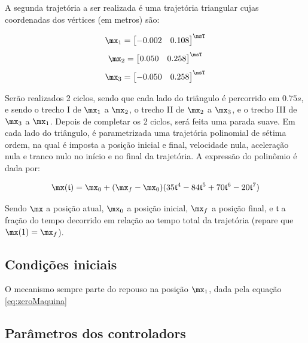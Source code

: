 \documentclass[]{politex}
\begin{document}
A segunda trajetória a ser realizada é uma trajetória triangular cujas coordenadas dos vértices (em metros) são:

\begin{equation} \label{eq:zeroMaquina}
\mx_1 = \begin{bmatrix}
-0.002 & 0.108 
\end{bmatrix}^\msT
\end{equation}
\begin{equation}
\mx_2 = \begin{bmatrix}
0.050 & 0.258 
\end{bmatrix}^\msT
\end{equation}
\begin{equation}
\mx_3 = \begin{bmatrix}
-0.050 & 0.258 
\end{bmatrix}^\msT
\end{equation}

Serão realizados 2 ciclos, sendo que cada lado do triângulo é percorrido em $0.75s$, e sendo o trecho I de $\mx_1$ a $\mx_2$, o trecho II de $\mx_2$ a $\mx_3$, e o trecho III de $\mx_3$ a $\mx_1$. Depois de completar os 2 ciclos, será feita uma parada suave. Em cada lado do triângulo, é parametrizada uma trajetória polinomial de sétima ordem, na qual é imposta a posição inicial e final, velocidade nula, aceleração nula e tranco nulo no início e no final da trajetória. A expressão do polinômio é dada por:

\begin{equation}
\mx(\mathfrak{t}) = \mx_0 + (\mx_f - \mx_0) (35 \mathfrak{t}^4 - 84 \mathfrak{t}^5 + 70 \mathfrak{t}^6 - 20 \mathfrak{t}^7)
\end{equation}

Sendo $\mx$ a posição atual, $\mx_0$ a posição inicial, $\mx_f$ a posição final, e $\mathfrak{t}$ a fração do tempo decorrido em relação ao tempo total da trajetória (repare que $\mx(1) = \mx_f$).

\subsection{Condições iniciais}

O mecanismo sempre parte do repouso na posição $\mx_1$, dada pela equação \eqref{eq:zeroMaquina}

\subsection{Parâmetros dos controladors}
\end{document}
